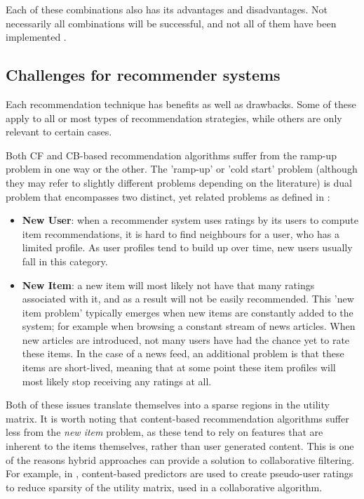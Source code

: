 Each of these combinations also has its advantages and disadvantages. Not necessarily all combinations will be successful, and not all of them have been implemented \cite{burke:2002}.



\subsection{Challenges for recommender systems}\label{chapter:literature_study:section:computer:subsection:challenges}


Each recommendation technique has benefits as well as drawbacks. Some of these apply to all or most types of recommendation strategies, while others are only relevant to certain cases.

Both CF and CB-based recommendation algorithms suffer from the ramp-up problem in one way or the other. The 'ramp-up' or 'cold start' problem (although they may refer to slightly different problems depending on the literature) is dual problem that encompasses two distinct, yet related problems as defined in \cite{burke:2002}:

\begin{itemize}
	\item \textbf{New User}: when a recommender system uses ratings by its users to compute item recommendations, it is hard to find neighbours for a user, who has a limited profile. As user profiles tend to build up over time, new users usually fall in this category.
	\item \textbf{New Item}: a new item will most likely not have that many ratings associated with it, and as a result will not be easily recommended. This 'new item problem' typically emerges when new items are constantly added to the system; for example when browsing a constant stream of news articles. When new articles are introduced, not many users have had the chance yet to rate these items. In the case of a news feed, an additional problem is that these items are short-lived, meaning that at some point these item profiles will most likely stop receiving any ratings at all.
\end{itemize}

Both of these issues translate themselves into a sparse regions in the utility matrix. It is worth noting that content-based recommendation algorithms suffer less from the \emph{new item} problem, as these tend to rely on features that are inherent to the items themselves, rather than user generated content. This is one of the reasons hybrid approaches can provide a solution to collaborative filtering\cite{burke:2002}. For example, in \cite{melville:2002:CCF:777092.777124}, content-based predictors are used to create pseudo-user ratings to reduce sparsity of the utility matrix, used in a collaborative algorithm.

